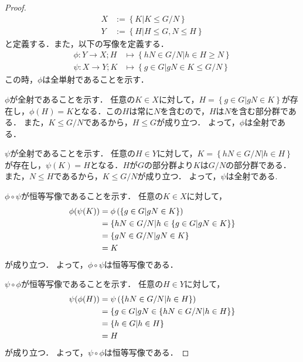 \begin{proof}

    \begin{align}
        X&:=\left\{ K | K \leq  G/N\right\} \\
        Y&:=\left\{ H | H\leq  G , N \leq   H \right\}
    \end{align}
    と定義する．また，以下の写像を定義する．
    \begin{align}
        \phi : Y \to X;H &\mapsto \left\{hN \in G/N | h \in H \geq  N\right\} \\
        \psi : X \to Y;K &\mapsto \left\{g\in G | gN \in K \leq  G/N \right\}
    \end{align}
    この時，$\phi$は全単射であることを示す．

    $\phi$が全射であることを示す．
    任意の$K\in X$に対して，$H=\left\{g\in G | gN \in K\right\}$が存在し，$\phi(H)=K$となる．この$H$は常に$N$を含むので，$H$は$N$を含む部分群である．
    また，$K\leq G/N$であるから，$H\leq G$が成り立つ．
    よって，$\phi$は全射である．

    $\psi$が全射であることを示す．
    任意の$H\in Y$に対して，$K=\left\{hN \in G/N | h \in H\right\}$が存在し，$\psi(K)=H$となる．$H$が$G$の部分群より$K$は$G/N$の部分群である．
    また，$N\leq H$であるから，$K\leq G/N$が成り立つ．
    よって，$\psi$は全射である.

    $\phi\circ\psi$が恒等写像であることを示す．
    任意の$K\in X$に対して，
    \begin{align}
        \phi(\psi(K)) &= \phi\left(\left\{g\in G | gN \in K\right\}\right) \notag\\
        &= \left\{hN \in G/N | h \in \left\{g\in G | gN \in K\right\}\right\} \notag\\
        &= \left\{gN \in G/N | gN \in K\right\} \notag\\
        &= K \notag
    \end{align}
    が成り立つ．
    よって，$\phi\circ\psi$は恒等写像である．

    $\psi\circ\phi$が恒等写像であることを示す．
    任意の$H\in Y$に対して，
    \begin{align}
        \psi(\phi(H)) &= \psi\left(\left\{hN \in G/N | h \in H\right\}\right) \notag\\   
        &= \left\{g\in G | gN \in \left\{hN \in G/N | h \in H\right\}\right\} \notag\\
        &= \left\{h \in G | h \in H\right\} \notag\\
        &= H \notag
    \end{align}
    が成り立つ．
    よって，$\psi\circ\phi$は恒等写像である．


\end{proof}
